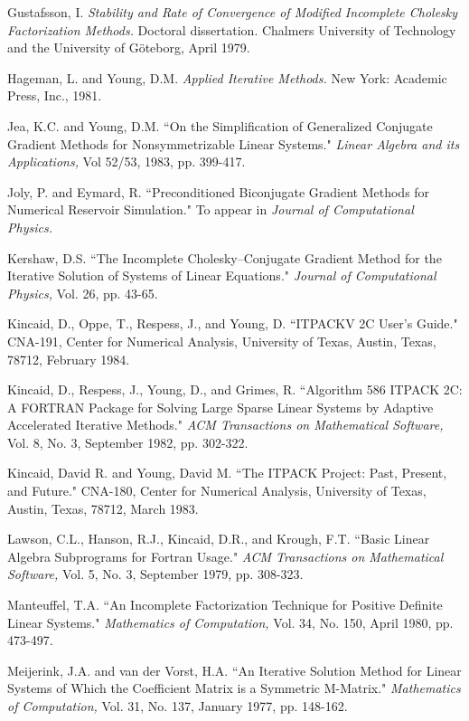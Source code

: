 \begin{thebibliography}{99}
 Gustafsson, I. {\em Stability and Rate of Convergence
 of Modified Incomplete Cholesky Factorization Methods.} Doctoral
 dissertation.  Chalmers University of Technology and the University
 of G\"{o}teborg, April 1979.
 
 Hageman, L. and Young, D.M. {\em Applied Iterative
 Methods.}  New York: Academic Press, Inc., 1981.

 Jea, K.C. and Young, D.M. ``On the
 Simplification of Generalized Conjugate Gradient Methods for
 Nonsymmetrizable Linear Systems."  {\em Linear Algebra and its
 Applications,} Vol 52/53, 1983, pp. 399-417.

 Joly, P. and Eymard, R. ``Preconditioned Biconjugate
 Gradient Methods for Numerical Reservoir Simulation."  To appear in
 {\em Journal of Computational Physics.}

 Kershaw, D.S. ``The Incomplete Cholesky--Conjugate
 Gradient Method for the Iterative Solution of Systems of Linear
 Equations." {\em Journal of Computational Physics,} Vol. 26,
 pp. 43-65.
 
 Kincaid, D., Oppe, T., Respess, J., and Young, D.
 ``ITPACKV 2C User's Guide." CNA-191, Center for Numerical Analysis,
 University of Texas, Austin, Texas, 78712, February 1984.

 Kincaid, D., Respess, J., Young, D., and Grimes, R.
 ``Algorithm 586 ITPACK 2C: A FORTRAN Package for Solving Large
 Sparse Linear Systems by Adaptive Accelerated Iterative Methods."
 {\em ACM Transactions on Mathematical Software,} Vol. 8, No. 3,
 September 1982, pp. 302-322. 

 Kincaid, David R. and Young, David M. ``The
 ITPACK Project: Past, Present, and Future." CNA-180, Center for
 Numerical Analysis, University of Texas, Austin, Texas, 78712,
 March 1983.

 Lawson, C.L., Hanson, R.J., Kincaid, D.R., and
 Krough, F.T. ``Basic Linear Algebra Subprograms for Fortran Usage."
 {\em ACM Transactions on Mathematical Software,} Vol. 5, No. 3,
 September 1979, pp. 308-323.

 Manteuffel, T.A. ``An Incomplete Factorization
 Technique for Positive Definite Linear Systems." {\em Mathematics
 of Computation,} Vol. 34, No. 150, April 1980, pp. 473-497.

 Meijerink, J.A. and van der Vorst, H.A. ``An
 Iterative Solution Method for Linear Systems of Which the
 Coefficient Matrix is a Symmetric M-Matrix." {\em Mathematics
 of Computation,} Vol. 31, No. 137, January 1977, pp. 148-162.


\end{thebibliography}
